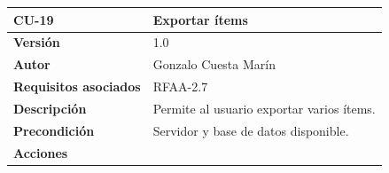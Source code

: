\documentclass[
]{article}
\begin{document}
\begin{longtable}[]{@{}ll@{}}
\toprule
\begin{minipage}[b]{0.23\columnwidth}\raggedright
\textbf{CU-19}\strut
\end{minipage} & \begin{minipage}[b]{0.71\columnwidth}\raggedright
\textbf{Exportar ítems}\strut
\end{minipage}\tabularnewline
\midrule
\endhead
\begin{minipage}[t]{0.23\columnwidth}\raggedright
\textbf{Versión}\strut
\end{minipage} & \begin{minipage}[t]{0.71\columnwidth}\raggedright
1.0\strut
\end{minipage}\tabularnewline
\begin{minipage}[t]{0.23\columnwidth}\raggedright
\textbf{Autor}\strut
\end{minipage} & \begin{minipage}[t]{0.71\columnwidth}\raggedright
Gonzalo Cuesta Marín\strut
\end{minipage}\tabularnewline
\begin{minipage}[t]{0.23\columnwidth}\raggedright
\textbf{Requisitos asociados}\strut
\end{minipage} & \begin{minipage}[t]{0.71\columnwidth}\raggedright
RFAA-2.7\strut
\end{minipage}\tabularnewline
\begin{minipage}[t]{0.23\columnwidth}\raggedright
\textbf{Descripción}\strut
\end{minipage} & \begin{minipage}[t]{0.71\columnwidth}\raggedright
Permite al usuario exportar varios ítems.\strut
\end{minipage}\tabularnewline
\begin{minipage}[t]{0.23\columnwidth}\raggedright
\textbf{Precondición}\strut
\end{minipage} & \begin{minipage}[t]{0.71\columnwidth}\raggedright
Servidor y base de datos disponible.\strut
\end{minipage}\tabularnewline
\begin{minipage}[t]{0.23\columnwidth}\raggedright
\textbf{Acciones}\strut
\end{minipage} & \begin{minipage}[t]{0.71\columnwidth}\raggedright
\begin{enumerate}
\def\labelenumi{\arabic{enumi}.}

\end{enumerate}
\end{minipage}
\end{longtable}
\end{document}
